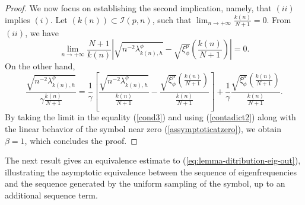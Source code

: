 \documentclass[11pt]{article}
\begin{document}
\begin{proof}
We now focus on establishing the second implication, namely, that $(ii)$ implies $(i)$. Let $(k(n))\subset \mathcal{I}(p,n)$, such that $\lim_{n \rightarrow +\infty}\frac{k(n)}{N+1}=0$. From $(ii)$, we have 
\begin{equation}\label{contadict2}
    \lim_{n \rightarrow +\infty} \frac{N+1}{k(n)}\left|\sqrt{n^{-2}\lambda_{k(n),h}^{\phi}}-\sqrt{\xi_{\phi}^p}\left(\frac{k(n)}{N+1}\right)\right|=0.
 \end{equation}
 On the other hand, 
 \begin{equation}\label{cond3}
     \frac{\sqrt{n^{-2}\lambda_{k(n),h}^{\phi}}}{\gamma \frac{k(n)}{N+1}}=\frac{1}{\gamma}\left[ \frac{\sqrt{n^{-2}\lambda_{k(n),h}^{\phi}}}{\frac{k(n)}{N+1}}-\frac{\sqrt{\xi_{\phi}^p}\left(\frac{k(n)}{N+1}\right)}{\frac{k(n)}{N+1}}\right]+\frac{1}{\gamma}\frac{\sqrt{\xi_{\phi}^p}\left(\frac{k(n)}{N+1}\right)}{\frac{k(n)}{N+1}}.
 \end{equation}
By taking the limit in the equality (\ref{cond3}) and using (\ref{contadict2}) along with the linear behavior of the symbol near zero (\ref{assymptoticatzero}), we obtain $\beta=1$, which concludes the proof.
\end{proof}
The next result gives an equivalence estimate to (\ref{eq:lemma-ditribution-eig-out}), illustrating the asymptotic equivalence between the sequence of eigenfrequencies and the sequence generated by the uniform sampling of the symbol, up to an additional sequence term.
\end{document}
